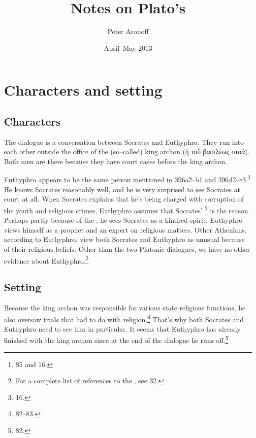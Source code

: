 \documentclass[11pt]{article}
\begin{document}
\begin{titlepage}
\title{Notes on Plato's }
\author{Peter Aronoff}
\date{April--May 2013}
\maketitle
\end{titlepage}

\section{Characters and setting}

\subsection{Characters}

The dialogue is a conversation between Socrates and Euthyphro.  They run into each other outside the office of the (so--called) king archon (ἡ τοῦ βασιλέως στοά).  Both men are there because they have court cases before the king archon.

Euthyphro appears to be the same person mentioned in  396a2--b1 and 396d2--e3.\footnote{\citet{burnet1924} 85 and \citet{bailly2003} 16.}  He knows Socrates reasonably well, and he is very surprised to see Socrates at court at all.  When Socrates explains that he's being charged with corruption of the youth and religious crimes, Euthyphro assumes that Socrates' \footnote{For a complete list of references to the , see \citet{bailly2003} 32.} is the reason.  Perhaps partly because of the , he sees Socrates as a kindred spirit: Euthyphro views himself as a prophet and an expert on religious matters.  Other Athenians, according to Euthyphro, view both Socrates and Euthyphro as unusual because of their religious beliefs.  Other than the two Platonic dialogues, we have no other evidence about Euthyphro.\footnote{\citet{bailly2003} 16.}

\subsection{Setting}

Because the king archon was responsible for various state religious functions, he also oversaw trials that had to do with religion.\footnote{\citet{burnet1924} 82--83.}  That's why both Socrates and Euthyphro need to see him in particular.  It seems that Euthyphro has already finished with the king archon since at the end of the dialogue he runs off.\footnote{\citet{burnet1924} 82.}
\end{document}
